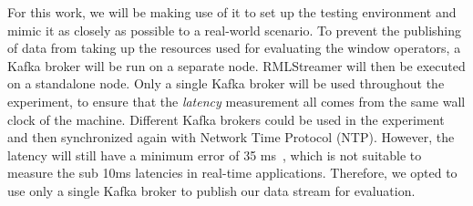 For this work, we will be making use of it to set up the testing 
environment and mimic it as closely as possible to a real-world scenario. 
To prevent the publishing of data from taking up the resources used for evaluating the 
window operators, a Kafka broker will be run on a separate node. RMLStreamer will then be 
executed on a standalone node. Only a single Kafka broker will be used throughout the experiment, 
to ensure that the \emph{latency} measurement all comes from the same wall clock of the machine. 
Different Kafka brokers could be used in the experiment and then synchronized again 
with Network Time Protocol (NTP). However, the latency will still have a minimum
error of 35 ms~\cite{ntp_latency}, which is not suitable to measure the sub 10ms latencies in 
real-time applications. Therefore, we opted to use only a single Kafka broker to publish
our data stream for evaluation.





